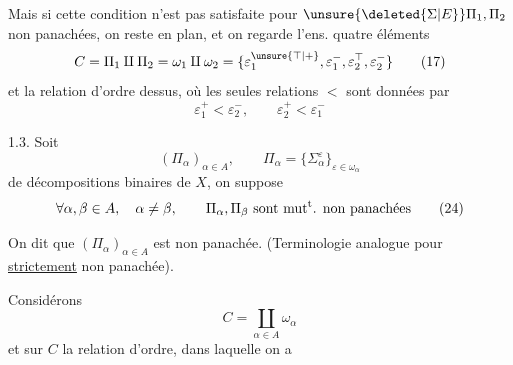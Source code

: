\begingroup\makeatletter\tagsleft@true\makeatother
Mais si cette condition n'est pas satisfaite pour $\unsure{\deleted{\Sigma|E}}\Pi_1,\Pi_2$ non panachées, on reste en plan, et on regarde l'ens.  quatre éléments
\[
C=\Pi_1\amalg\Pi_2=\omega_1\amalg\omega_2
=\{\varepsilon_1^{\unsure{\top|+}},\varepsilon_1^-,\varepsilon_2^{\top},\varepsilon_2^-\}
\tag*{(17)}
\]
et la relation d'ordre dessus, où les seules relations $<$ sont données par
\[
\varepsilon_1^+<\varepsilon_2^-,\qquad\varepsilon_2^+<\varepsilon_1^-
\tag*{(22)}
\]

1.3. Soit 
\[
(\Pi_\alpha)_{\alpha\in A},\qquad \Pi_\alpha=\{\Sigma_\alpha^\varepsilon\}_{\varepsilon\in\omega_\alpha}
\tag*{(23)}
\]
   de décompositions binaires de $X$, on suppose 
\[
\forall\alpha,\beta\in A,\quad\alpha\ne\beta,\qquad
\Pi_\alpha,\Pi_\beta\ \text{sont mut\textsuperscript{t}. non panachées}
\tag*{(24)}
\]

 On dit  que $(\Pi_\alpha)_{\alpha\in A}$ est non panachée. (Terminologie analogue pour \uline{strictement} non panachée).

Considérons
\[
C=\coprod_{\alpha\in A}\omega_\alpha
\tag*{(25)}
\]
et sur $C$ la relation d'ordre, dans laquelle on a

\endgroup
\clearpage
